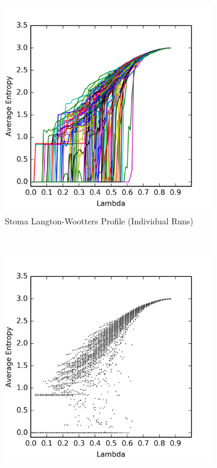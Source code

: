 \documentclass[a4paper,11pt]{article}
\begin{document}
\begin{figure}[htp]
\centering
\begin{subfigure}[t]{0.45\textwidth}
  \includegraphics[width=\textwidth]{ch6_figs/stoma_entropy}
  \caption{Stoma Langton-Wootters Profile (Individual Runs)}
  \label{fig:stoma_lw_run}
\end{subfigure}
~
\begin{subfigure}[t]{0.45\textwidth}
  \centering
  \includegraphics[width=\textwidth]{ch6_figs/stoma_entropy_scatter}

\end{subfigure}
\end{figure}
\end{document}
